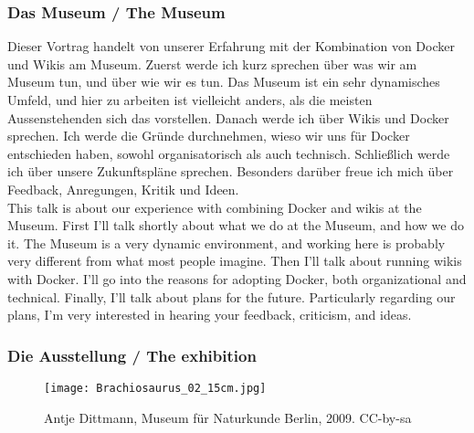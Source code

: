 {\scriptsize
\begin{frame}
  \frametitle{Das Museum / \textcolor{mfn_green}{The Museum}}
  Dieser Vortrag handelt von unserer Erfahrung mit der Kombination von Docker und Wikis am Museum. Zuerst werde ich kurz sprechen über was wir am Museum tun, und über wie wir es tun. Das Museum ist ein sehr dynamisches Umfeld, und hier zu arbeiten ist vielleicht anders, als die meisten Aussenstehenden sich das vorstellen. Danach werde ich über Wikis und Docker sprechen. Ich werde die Gründe durchnehmen, wieso wir uns für Docker entschieden haben, sowohl organisatorisch als auch technisch. Schließlich werde ich über unsere Zukunftspläne sprechen. Besonders darüber freue ich mich über Feedback, Anregungen, Kritik und Ideen.\\
  \bigskip
  \textcolor{mfn_green}{This talk is about our experience with combining Docker and wikis at the Museum. First I'll talk shortly about what we do at the Museum, and how we do it. The Museum is a very dynamic environment, and working here is probably very different from what most people imagine. Then I'll talk about running wikis with Docker. I'll go into the reasons for adopting Docker, both organizational and technical. Finally, I'll talk about plans for the future. Particularly regarding our plans, I'm very interested in hearing your feedback, criticism, and ideas.}
\end{frame}
}
\begin{frame}
  \frametitle{Die Ausstellung / \textcolor{mfn_green}{The exhibition}}
  \begin{figure}
  \texttt{[image: Brachiosaurus\_02\_15cm.jpg]}
  \caption{\textcopyright Antje Dittmann, Museum für Naturkunde Berlin, 2009. CC-by-sa}
  \end{figure}
\end{frame}

